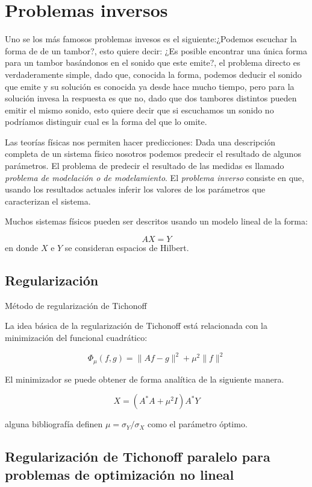 
\section{Problemas inversos}

Uno se los más famosos problemas invesos es el siguiente:¿Podemos
escuchar la forma de de un tambor?, esto quiere decir: ¿Es posible
encontrar una única forma para un tambor basándonos en el sonido que
este emite?, el problema directo es verdaderamente simple, dado que,
conocida la forma, podemos deducir el sonido que emite y su solución
es conocida ya desde hace mucho tiempo, pero para la solución invesa
la respuesta es que no, dado que dos tambores distintos pueden emitir
el mismo sonido, esto quiere decir que si escuchamos un sonido no
podríamos distinguir cual es la forma del que lo omite.

Las teorías físicas nos permiten hacer predicciones: Dada una
descripción completa de un sistema físico nosotros podemos predecir el
resultado de algunos parámetros. El problema de predecir el resultado
de las medidas es llamado \textit{problema de modelación o de
  modelamiento}. El \textit{problema inverso} consiste en que, usando
los resultados actuales inferir los valores de los parámetros que
caracterizan el sistema.

Muchos sistemas físicos pueden ser descritos usando un modelo lineal
de la forma:

$$AX = Y$$ en donde $X$ e $Y$ se consideran espacios de Hilbert.


\subsection{Regularización}

Método de regularización de Tichonoff

La idea básica de la regularización de Tichonoff está relacionada con
la minimización del funcional cuadrático:

$$\Phi_\mu(f,g) = \| Af-g\|^2 + \mu^2 \| f\|^2$$

El minimizador se puede obtener de forma analítica de la siguiente
manera.

$$X = \left(A^*A+\mu^2 I \right)A^*Y$$

alguna bibliografía definen $\mu = \sigma_Y/\sigma_X$ como el
parámetro óptimo.



\subsection{Regularización de Tichonoff paralelo  para problemas de optimización no lineal}


